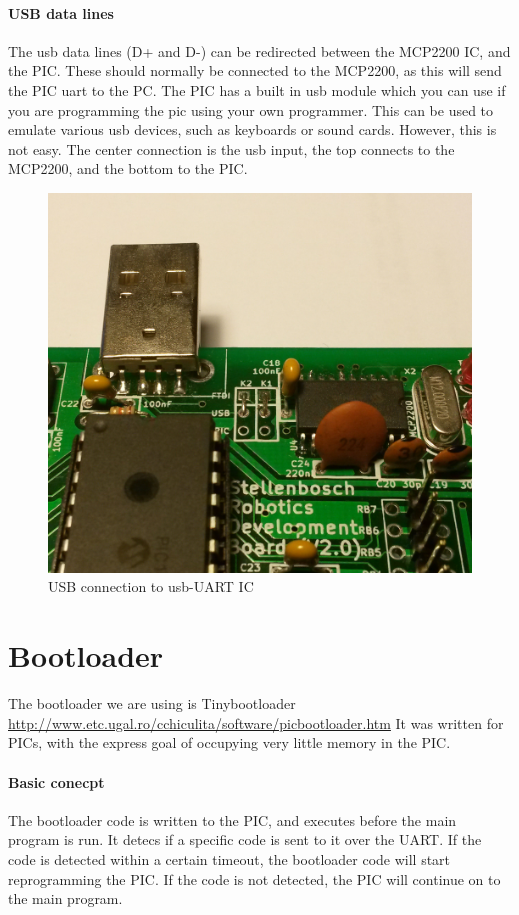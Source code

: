 \documentclass{article}
\begin{document}
\paragraph{USB data lines}
The usb data lines (D+ and D-) can be redirected between the MCP2200 IC, and the PIC. These should normally be connected to the MCP2200, as this will send the PIC uart to the PC. The PIC has a built in usb module which you can use if you are programming the pic using your own programmer. This can be used to emulate various usb devices, such as keyboards or sound cards. However, this is not easy. The center connection is the usb input, the top connects to the MCP2200, and the bottom to the PIC.
\begin{figure}[h!]
	\centering
    \includegraphics[scale=0.25]{usb_jumpers.jpg}
    \caption {USB connection to usb-UART IC}
\end{figure}

\section {Bootloader}
The bootloader we are using is Tinybootloader \url{http://www.etc.ugal.ro/cchiculita/software/picbootloader.htm} It was written for PICs, with the express goal of occupying very little memory in the PIC.
\paragraph{Basic conecpt}
The bootloader code is written to the PIC, and executes before the main program is run. It detecs if a specific code is sent to it over the UART. If the code is detected within a certain timeout, the bootloader code will start reprogramming the PIC. If the code is not detected, the PIC will continue on to the main program.
\end{document}
